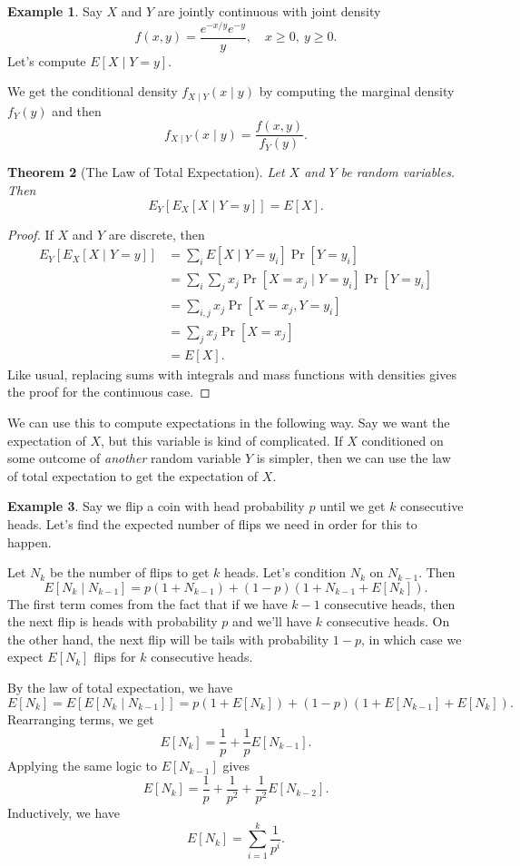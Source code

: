 \documentclass[12pt]{article}
\theoremstyle{plain}
\newtheorem{theorem}{Theorem}[section]
\theoremstyle{definition}
\newtheorem{example}[theorem]{Example}
\theoremstyle{remark}
\begin{document}
\begin{example}
    Say $X$ and $Y$ are jointly continuous with joint density
    \[
        f(x,y) = \frac{e^{-x/y}e^{-y}}{y},\quad x\geq 0,\ y\geq 0.
    \]
    Let's compute $E[X\mid Y = y]$.

    We get the conditional density $f_{X\mid Y}(x\mid y)$ by computing the marginal density $f_Y(y)$ and then
    \[
        f_{X\mid Y}(x\mid y) = \frac{f(x,y)}{f_Y(y)}.
    \]
\end{example}


\begin{theorem}[The Law of Total Expectation]
Let $X$ and $Y$ be random variables.
Then
\[
    E_Y[E_X[X\mid Y = y]] = E[X].
\]
\end{theorem}
\begin{proof}
    If $X$ and $Y$ are discrete, then
    \begin{align*}
        E_Y[E_X[X\mid Y = y]] &= \sum_iE[X\mid Y = y_i]\Pr[Y = y_i]\\
        &= \sum_i\sum_jx_j\Pr[X = x_j\mid Y = y_i]\Pr[Y = y_i]\\
        &= \sum_{i,j} x_j \Pr[X = x_j, Y = y_i]\\
        &= \sum_j x_j\Pr[X = x_j]\\
        &= E[X].
    \end{align*}
    Like usual, replacing sums with integrals and mass functions with densities gives the proof for the continuous case.
\end{proof}

We can use this to compute expectations in the following way.
Say we want the expectation of $X$, but this variable is kind of complicated.
If $X$ conditioned on some outcome of \emph{another} random variable $Y$ is simpler, then we can use the law of total expectation to get the expectation of $X$.

\begin{example}
    Say we flip a coin with head probability $p$ until we get $k$ consecutive heads.
    Let's find the expected number of flips we need in order for this to happen.

    Let $N_k$ be the number of flips to get $k$ heads.
    Let's condition $N_k$ on $N_{k-1}$.
    Then
    \[
        E[N_k \mid N_{k-1}] = p(1+N_{k-1}) + (1-p)(1 + N_{k-1} + E[N_k]).
    \]
    The first term comes from the fact that if we have $k-1$ consecutive heads, then the next flip is heads with probability $p$ and we'll have $k$ consecutive heads.
    On the other hand, the next flip will be tails with probability $1-p$, in which case we expect $E[N_k]$ flips for $k$ consecutive heads.

    By the law of total expectation, we have
    \[
        E[N_k] = E[E[N_k\mid N_{k-1}]] = p(1 + E[N_k]) + (1-p)(1 + E[N_{k-1}] + E[N_k]).
    \]
    Rearranging terms, we get
    \[
        E[N_k] = \frac{1}{p} + \frac{1}{p}E[N_{k-1}].
    \]
    Applying the same logic to $E[N_{k-1}]$ gives
    \[
        E[N_k] = \frac{1}{p} + \frac{1}{p^2} + \frac{1}{p^2}E[N_{k-2}].
    \]
    Inductively, we have
    \[
        E[N_k] = \sum_{i=1}^k\frac{1}{p^i}.
    \]
\end{example}
\end{document}
